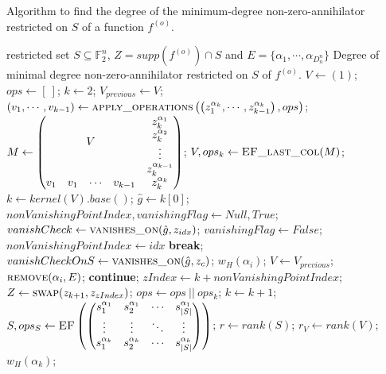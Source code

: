 \documentclass[11pt]{llncs}
\begin{document}
\begin{algorithm}[H]
\small
	\caption{Algorithm to find the degree of the minimum-degree non-zero-annihilator restricted on $S$ of a function $f^{(o)}$.}\label{alg:MinDegreeSnonZeroAnnihilatorIterative}
	\begin{algorithmic}[1]
		\Require restricted set $S\subseteq \mathbb{F}_2^n$, $Z = supp\left(f^{(o)}\right) \cap S$ and $E = \{\alpha_1, \cdots, \alpha_{D_n^n}\}$
		\Ensure Degree of minimal degree non-zero-annihilator restricted on $S$ of $f^{(o)}$.
		\State $V\gets (1)$;
		\State $ops \gets [\ ]$;
		\State $k \gets 2$;
		\State $V_{previous} \gets V$;
		\State $\left(v_1, \cdots, v_{k-1}\right) \gets \mbox{\textsc{apply\_operations}}\left(\left(z_1^{\alpha_k}, \cdots, z_{k-1}^{\alpha_k}\right), ops\right)$\footnotemark;
		\State  $M \gets \begin{pmatrix}
		\multicolumn{4}{c}{\multirow{4}{*}{$V$}} & z_k^{\alpha_1}\\
		& & & & z_k^{\alpha_2}\\
		& & & & \vdots\\
		& & & & z_k^{\alpha_{k-1}}\\
		v_1 & v_1& \cdots & v_{k-1} & z_k^{\alpha_k}
		\end{pmatrix}$;
		\State $V, ops_k\gets \mbox{\textsc{EF\_last\_col}}(M)$\footnotemark;
		\State $k \gets kernel\left(V\right).base()$;
		\State $\hat{g} \gets k[0]$;
		\State $nonVanishingPointIndex, vanishingFlag \gets Null, True$;
		\State $vanishCheck \gets \mbox{\textsc{vanishes\_on}}(\hat{g}, z_{idx})$\footnotemark;
		\State $vanishingFlag \gets False$;
        \State $nonVanishingPointIndex \gets idx$
		\State \textbf{break};
		\EndIf
        \EndFor
		\State $vanishCheckOnS \gets \mbox{\textsc{vanishes\_on}}(\hat{g}, z_c)$;
		\State \Return $w_H\left(\alpha_i\right)$;
		\EndIf
		\EndFor
		\State $V\gets V_{previous}$;
		\State $\mbox{\textsc{remove}}(\alpha_i, E)$; 
		\State \textbf{continue}; 
        \Else
		\State $zIndex \gets k+nonVanishingPointIndex$;
		\State $Z \gets \mbox{\textsc{swap}}(z_{k+1}, z_{zIndex})$\footnotemark;
		\EndIf
        \State $ops\gets ops\ ||\ ops_k$;
		\State $k\gets k+1$;
		\EndIf
		\EndWhile
        \State $S, ops_S \gets \mbox{\textsc{EF}}\left(
		\begin{pmatrix}
		s_1^{\alpha_1} &  s_2^{\alpha_1} & \cdots & s_{|S|}^{\alpha_{1}}\\
		\vdots &  \vdots & \ddots & \vdots\\
		s_{1}^{\alpha_k} &  s_{2}^{\alpha_k} & \cdots & s_{|S|}^{\alpha_{k}}\\
		\end{pmatrix}\right)$;
		\State $r \gets rank(S)$;
        \State $r_V \gets rank(V)$;
		\State \Return $w_H\left(\alpha_k\right)$;
		\EndIf
		\State {}
	\end{algorithmic}
\end{algorithm}
\end{document}
